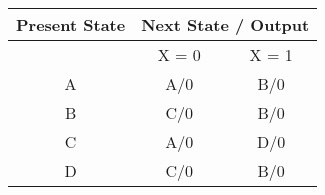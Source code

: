 \begin{table}[]
	\begin{tabular}{|c|c|l|c|l|}
		\hline
		\rowcolor[HTML]{FFCCC9}
		Present State & \multicolumn{4}{c|}{\cellcolor[HTML]{FFCCC9}Next State / Output}                                                      \\ \hline
		\rowcolor[HTML]{FFCCC9}
		              & \multicolumn{2}{c|}{\cellcolor[HTML]{FFCCC9}X = 0}               & \multicolumn{2}{c|}{\cellcolor[HTML]{FFCCC9}X = 1} \\ \hline
		\rowcolor[HTML]{FFFFFF}
		A             & \multicolumn{2}{c|}{\cellcolor[HTML]{FFFFFF}A/0}                 & \multicolumn{2}{c|}{\cellcolor[HTML]{FFFFFF}B/0}   \\ \hline
		\rowcolor[HTML]{FFFFFF}
		B             & \multicolumn{2}{c|}{\cellcolor[HTML]{FFFFFF}C/0}                 & \multicolumn{2}{c|}{\cellcolor[HTML]{FFFFFF}B/0}   \\ \hline
		\rowcolor[HTML]{FFFFFF}
		C             & \multicolumn{2}{c|}{\cellcolor[HTML]{FFFFFF}A/0}                 & \multicolumn{2}{c|}{\cellcolor[HTML]{FFFFFF}D/0}   \\ \hline
		\rowcolor[HTML]{FFFFFF}
		D             & \multicolumn{2}{c|}{\cellcolor[HTML]{FFFFFF}C/0}                 & \multicolumn{2}{c|}{\cellcolor[HTML]{FFFFFF}B/0}   \\ \hline
	\end{tabular}
\end{table}
